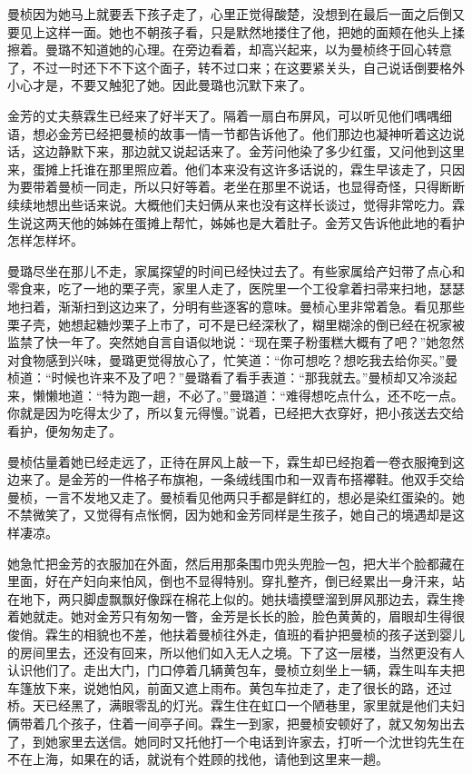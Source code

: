 \par 曼桢因为她马上就要丢下孩子走了，心里正觉得酸楚，没想到在最后一面之后倒又要见上这样一面。她也不朝孩子看，只是默然地搂住了他，把她的面颊在他头上揉擦着。曼璐不知道她的心理。在旁边看着，却高兴起来，以为曼桢终于回心转意了，不过一时还下不下这个面子，转不过口来；在这要紧关头，自己说话倒要格外小心才是，不要又触犯了她。因此曼璐也沉默下来了。
\par 金芳的丈夫蔡霖生已经来了好半天了。隔着一扇白布屏风，可以听见他们喁喁细语，想必金芳已经把曼桢的故事一情一节都告诉他了。他们那边也凝神听着这边说话，这边静默下来，那边就又说起话来了。金芳问他染了多少红蛋，又问他到这里来，蛋摊上托谁在那里照应着。他们本来没有这许多话说的，霖生早该走了，只因为要带着曼桢一同走，所以只好等着。老坐在那里不说话，也显得奇怪，只得断断续续地想出些话来说。大概他们夫妇俩从来也没有这样长谈过，觉得非常吃力。霖生说这两天他的姊姊在蛋摊上帮忙，姊姊也是大着肚子。金芳又告诉他此地的看护怎样怎样坏。
\par 曼璐尽坐在那儿不走，家属探望的时间已经快过去了。有些家属给产妇带了点心和零食来，吃了一地的栗子壳，家里人走了，医院里一个工役拿着扫帚来扫地，瑟瑟地扫着，渐渐扫到这边来了，分明有些逐客的意味。曼桢心里非常着急。看见那些栗子壳，她想起糖炒栗子上市了，可不是已经深秋了，糊里糊涂的倒已经在祝家被监禁了快一年了。突然她自言自语似地说：“现在栗子粉蛋糕大概有了吧？”她忽然对食物感到兴味，曼璐更觉得放心了，忙笑道：“你可想吃？想吃我去给你买。”曼桢道：“时候也许来不及了吧？”曼璐看了看手表道：“那我就去。”曼桢却又冷淡起来，懒懒地道：“特为跑一趟，不必了。”曼璐道：“难得想吃点什么，还不吃一点。你就是因为吃得太少了，所以复元得慢。”说着，已经把大衣穿好，把小孩送去交给看护，便匆匆走了。
\par 曼桢估量着她已经走远了，正待在屏风上敲一下，霖生却已经抱着一卷衣服掩到这边来了。是金芳的一件格子布旗袍，一条绒线围巾和一双青布搭襻鞋。他双手交给曼桢，一言不发地又走了。曼桢看见他两只手都是鲜红的，想必是染红蛋染的。她不禁微笑了，又觉得有点怅惘，因为她和金芳同样是生孩子，她自己的境遇却是这样凄凉。
\par 她急忙把金芳的衣服加在外面，然后用那条围巾兜头兜脸一包，把大半个脸都藏在里面，好在产妇向来怕风，倒也不显得特别。穿扎整齐，倒已经累出一身汗来，站在地下，两只脚虚飘飘好像踩在棉花上似的。她扶墙摸壁溜到屏风那边去，霖生搀着她就走。她对金芳只有匆匆一瞥，金芳是长长的脸，脸色黄黄的，眉眼却生得很俊俏。霖生的相貌也不差，他扶着曼桢往外走，值班的看护把曼桢的孩子送到婴儿的房间里去，还没有回来，所以他们如入无人之境。下了这一层楼，当然更没有人认识他们了。走出大门，门口停着几辆黄包车，曼桢立刻坐上一辆，霖生叫车夫把车篷放下来，说她怕风，前面又遮上雨布。黄包车拉走了，走了很长的路，还过桥。天已经黑了，满眼零乱的灯光。霖生住在虹口一个陋巷里，家里就是他们夫妇俩带着几个孩子，住着一间亭子间。霖生一到家，把曼桢安顿好了，就又匆匆出去了，到她家里去送信。她同时又托他打一个电话到许家去，打听一个沈世钧先生在不在上海，如果在的话，就说有个姓顾的找他，请他到这里来一趟。

